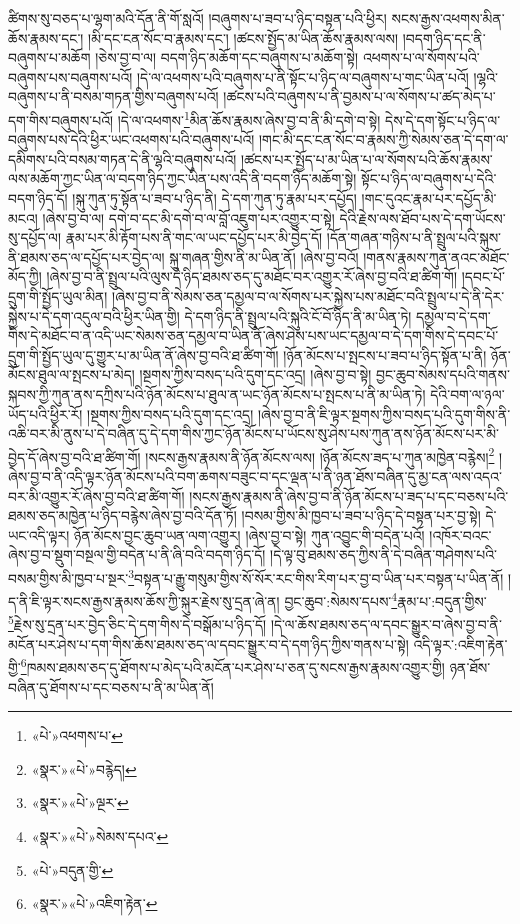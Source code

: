ཚིགས་སུ་བཅད་པ་ལྷག་མའི་དོན་ནི་གོ་སླའོ། །བཞུགས་པ་ཟབ་པ་ཉིད་བསྟན་པའི་ཕྱིར། སངས་རྒྱས་འཕགས་མིན་ཆོས་རྣམས་དང་། །མི་དང་ངན་སོང་བ་རྣམས་དང་། །ཚངས་སྤྱོད་མ་ཡིན་ཆོས་རྣམས་ལས། །བདག་ཉིད་དང་ནི་བཞུགས་པ་མཆོག །ཅེས་བྱ་བ་ལ། བདག་ཉིད་མཆོག་དང་བཞུགས་པ་མཆོག་སྟེ། འཕགས་པ་ལ་སོགས་པའི་བཞུགས་པས་བཞུགས་པའོ། །དེ་ལ་འཕགས་པའི་བཞུགས་པ་ནི་སྟོང་པ་ཉིད་ལ་བཞུགས་པ་གང་ཡིན་པའོ། །ལྷའི་བཞུགས་པ་ནི་བསམ་གཏན་གྱིས་བཞུགས་པའོ། །ཚངས་པའི་བཞུགས་པ་ནི་བྱམས་པ་ལ་སོགས་པ་ཚད་མེད་པ་དག་གིས་བཞུགས་པའོ། །དེ་ལ་འཕགས་\footnote{«པེ་»འཕགས་པ་}མིན་ཆོས་རྣམས་ཞེས་བྱ་བ་ནི་མི་དགེ་བ་སྟེ། དེས་དེ་དག་སྟོང་པ་ཉིད་ལ་བཞུགས་པས་དེའི་ཕྱིར་ཡང་འཕགས་པའི་བཞུགས་པའོ། །གང་མི་དང་ངན་སོང་བ་རྣམས་ཀྱི་སེམས་ཅན་དེ་དག་ལ་དམིགས་པའི་བསམ་གཏན་དེ་ནི་ལྷའི་བཞུགས་པའོ། །ཚངས་པར་སྤྱོད་པ་མ་ཡིན་པ་ལ་སོགས་པའི་ཆོས་རྣམས་ལས་མཆོག་ཀྱང་ཡིན་ལ་བདག་ཉིད་ཀྱང་ཡིན་པས་འདི་ནི་བདག་ཉིད་མཆོག་སྟེ། སྟོང་པ་ཉིད་ལ་བཞུགས་པ་དེའི་བདག་ཉིད་དོ། །སྐུ་ཀུན་ཏུ་སྟོན་པ་ཟབ་པ་ཉིད་ནི། དེ་དག་ཀུན་ཏུ་རྣམ་པར་དཔྱོད། །གང་དུའང་རྣམ་པར་དཔྱོད་མི་མངའ། །ཞེས་བྱ་བ་ལ། དགེ་བ་དང་མི་དགེ་བ་ལ་བློ་འཇུག་པར་འགྱུར་བ་སྟེ། དེའི་རྗེས་ལས་ཐོབ་པས་དེ་དག་ཡོངས་སུ་དཔྱོད་ལ། རྣམ་པར་མི་རྟོག་པས་ནི་གང་ལ་ཡང་དཔྱོད་པར་མི་བྱེད་དོ། །དོན་གཞན་གཉིས་པ་ནི་སྤྲུལ་པའི་སྐུས་ནི་ཐམས་ཅད་ལ་དཔྱོད་པར་བྱེད་ལ། སྐུ་གཞན་གྱིས་ནི་མ་ཡིན་ནོ། །ཞེས་བྱ་བའོ། །གནས་རྣམས་ཀུན་ནའང་མཐོང་མོད་ཀྱི། །ཞེས་བྱ་བ་ནི་སྤྲུལ་པའི་ལུས་དེ་ཉིད་ཐམས་ཅད་དུ་མཐོང་བར་འགྱུར་རོ་ཞེས་བྱ་བའི་ཐ་ཚིག་གོ། །དབང་པོ་དྲུག་གི་སྤྱོད་ཡུལ་མིན། །ཞེས་བྱ་བ་ནི་སེམས་ཅན་དམྱལ་བ་ལ་སོགས་པར་སྐྱེས་པས་མཐོང་བའི་སྤྲུལ་པ་དེ་ནི་དེར་སྐྱེས་པ་དེ་དག་འདུལ་བའི་ཕྱིར་ཡིན་གྱི། དེ་དག་ཉིད་ནི་སྤྲུལ་པའི་སྐུའི་ངོ་བོ་ཉིད་ནི་མ་ཡིན་ཏེ། དམྱལ་བ་དེ་དག་གིས་དེ་མཐོང་བ་ན་འདི་ཡང་སེམས་ཅན་དམྱལ་བ་ཡིན་ནོ་ཞེས་ཤེས་པས་ཡང་དམྱལ་བ་དེ་དག་གིས་དེ་དབང་པོ་དྲུག་གི་སྤྱོད་ཡུལ་དུ་གྱུར་པ་མ་ཡིན་ནོ་ཞེས་བྱ་བའི་ཐ་ཚིག་གོ། །ཉོན་མོངས་པ་སྤངས་པ་ཟབ་པ་ཉིད་སྟོན་པ་ནི། ཉོན་མོངས་ཐུལ་ལ་སྤངས་པ་མེད། །སྔགས་ཀྱིས་བསད་པའི་དུག་དང་འདྲ། །ཞེས་བྱ་བ་སྟེ། བྱང་ཆུབ་སེམས་དཔའི་གནས་སྐབས་ཀྱི་ཀུན་ནས་དཀྲིས་པའི་ཉོན་མོངས་པ་ཐུལ་ན་ཡང་ཉོན་མོངས་པ་སྤངས་པ་ནི་མ་ཡིན་ཏེ། དེའི་བག་ལ་ཉལ་ཡོད་པའི་ཕྱིར་རོ། །སྔགས་ཀྱིས་བསད་པའི་དུག་དང་འདྲ། །ཞེས་བྱ་བ་ནི་ཇི་ལྟར་སྔགས་ཀྱིས་བསད་པའི་དུག་གིས་ནི་འཆི་བར་མི་ནུས་པ་དེ་བཞིན་དུ་དེ་དག་གིས་ཀྱང་ཉོན་མོངས་པ་ཡོངས་སུ་ཤེས་པས་ཀུན་ནས་ཉོན་མོངས་པར་མི་བྱེད་དོ་ཞེས་བྱ་བའི་ཐ་ཚིག་གོ། །སངས་རྒྱས་རྣམས་ནི་ཉོན་མོངས་ལས། །ཉོན་མོངས་ཟད་པ་ཀུན་མཁྱེན་བརྙེས།\footnote{«སྣར་»«པེ་»བརྙེད།} །ཞེས་བྱ་བ་ནི་འདི་ལྟར་ཉོན་མོངས་པའི་བག་ཆགས་བཟུང་བ་དང་ལྡན་པ་ནི་ཉན་ཐོས་བཞིན་དུ་མྱ་ངན་ལས་འདའ་བར་མི་འགྱུར་རོ་ཞེས་བྱ་བའི་ཐ་ཚིག་གོ། །སངས་རྒྱས་རྣམས་ནི་ཞེས་བྱ་བ་ནི་ཉོན་མོངས་པ་ཟད་པ་དང་བཅས་པའི་ཐམས་ཅད་མཁྱེན་པ་ཉིད་བརྙེས་ཞེས་བྱ་བའི་དོན་ཏོ། །བསམ་གྱིས་མི་ཁྱབ་པ་ཟབ་པ་ཉིད་དེ་བསྟན་པར་བྱ་སྟེ། དེ་ཡང་འདི་ལྟར། ཉོན་མོངས་བྱང་ཆུབ་ཡན་ལག་འགྱུར། །ཞེས་བྱ་བ་སྟེ། ཀུན་འབྱུང་གི་བདེན་པའོ། །འཁོར་བའང་ཞེས་བྱ་བ་སྡུག་བསྔལ་གྱི་བདེན་པ་ནི་ཞི་བའི་བདག་ཉིད་དོ། །དེ་ལྟ་བུ་ཐམས་ཅད་ཀྱིས་ནི་དེ་བཞིན་གཤེགས་པའི་བསམ་གྱིས་མི་ཁྱབ་པ་སྔར་\footnote{«སྣར་»«པེ་»ལྔར་}བསྟན་པ་རྒྱུ་གསུམ་གྱིས་སོ་སོར་རང་གིས་རིག་པར་བྱ་བ་ཡིན་པར་བསྟན་པ་ཡིན་ནོ། །ད་ནི་ཇི་ལྟར་སངས་རྒྱས་རྣམས་ཆོས་ཀྱི་སྐུར་རྗེས་སུ་དྲན་ཞེ་ན། བྱང་ཆུབ་:སེམས་དཔས་\footnote{«སྣར་»«པེ་»སེམས་དཔའ་}རྣམ་པ་:བདུན་གྱིས་\footnote{«པེ་»བདུན་གྱི་}རྗེས་སུ་དྲན་པར་བྱེད་ཅིང་དེ་དག་གིས་དེ་བསྒོམ་པ་ཉིད་དོ། །དེ་ལ་ཆོས་ཐམས་ཅད་ལ་དབང་སྒྱུར་བ་ཞེས་བྱ་བ་ནི་མངོན་པར་ཤེས་པ་དག་གིས་ཆོས་ཐམས་ཅད་ལ་དབང་སྒྱུར་བ་དེ་དག་ཉིད་ཀྱིས་གནས་པ་སྟེ། འདི་ལྟར་:འཇིག་རྟེན་གྱི་\footnote{«སྣར་»«པེ་»འཇིག་རྟེན་}ཁམས་ཐམས་ཅད་དུ་ཐོགས་པ་མེད་པའི་མངོན་པར་ཤེས་པ་ཅན་དུ་སངས་རྒྱས་རྣམས་འགྱུར་གྱི། ཉན་ཐོས་བཞིན་དུ་ཐོགས་པ་དང་བཅས་པ་ནི་མ་ཡིན་ནོ། 